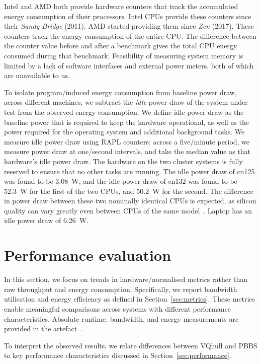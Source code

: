 \documentclass[11pt,a4paper]{article}
\begin{document}
Intel and AMD both provide hardware counters that track the accumulated energy consumption of their processors.
Intel CPUs provide these counters since their \emph{Sandy Bridge} (2011).
AMD started providing them since \emph{Zen} (2017).
These counters track the energy consumption of the entire CPU.
The difference between the counter value before and after a benchmark gives the total CPU energy consumed during that benchmark.
Feasibility of measuring system memory is limited by a lack of software interfaces and external power meters, both of which are unavailable to us.

To isolate program\-/induced energy consumption from baseline power draw, across different machines, we subtract the \emph{idle} power draw of the system under
test from the observed energy consumption.
We define idle power draw as the baseline power that is required to keep the hardware operational, as well as the power required for the operating system and additional background tasks.
We measure idle power draw using RAPL counters: across a five\-/minute period, we measure power draw at one\-/second intervals, and take the median value as that hardware's idle power draw.
The hardware on the two cluster systems is fully reserved to ensure that no other tasks are running.
The idle power draw of cn125 was found to be \qty{3.08}{\watt}, and the idle power draw of cn132 was found to be \qty{52.3}{\watt} for the first of the two CPUs, and \qty{50.2}{\watt} for the second.
The difference in power draw between these two nominally identical CPUs is expected, as silicon quality can vary greatly even between CPUs of the same model~\cite{kistowski2016variations}.
Laptop has an idle power draw of \qty{6.26}{\watt}.

\section{Performance evaluation}\label{sec:evaluation}
In this section, we focus on trends in hardware\-/normalised metrics rather than raw throughput and energy consumption.
Specifically, we report bandwidth utilisation and energy efficiency as defined in Section~\ref{sec:metrics}.
These metrics enable meaningful comparisons across systems with different performance characteristics.
Absolute runtime, bandwidth, and energy measurements are provided in the artefact~\cite{vqhull2025artefact}.

To interpret the observed results, we relate differences between VQhull and PBBS to key performance characteristics discussed in Section~\ref{sec:performance}.
\end{document}
